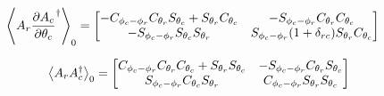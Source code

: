 \begin{align}\label{eqn:multiPendulumSpherical2:boo51}
\gpgradezero{ A_r \PD{\theta_c}{A_c}^\dagger }
&=
\begin{bmatrix}
-C_{\phi_c - \phi_r} C_{\theta_r} S_{\theta_c} + S_{\theta_r} C_{\theta_c} &
-S_{\phi_c - \phi_r} C_{\theta_r} C_{\theta_c} \\
-S_{\phi_c - \phi_r} S_{\theta_c} S_{\theta_r} &
S_{\phi_c - \phi_r} (1 + \delta_{rc}) S_{\theta_r} C_{\theta_c} 
\end{bmatrix}
\end{align}

\begin{align}\label{eqn:multiPendulumSpherical2:boo20x}
\gpgradezero{A_r A_c^\dagger}
=
\begin{bmatrix}
C_{\phi_c - \phi_r} 
C_{\theta_r}
C_{\theta_c}
+S_{\theta_r}
S_{\theta_c} &
-S_{\phi_c - \phi_r} C_{\theta_r} S_{\theta_c} \\
S_{\phi_c - \phi_r} C_{\theta_c} S_{\theta_r} &
C_{\phi_c - \phi_r} S_{\theta_r} S_{\theta_c}
\end{bmatrix}
\end{align}

\EndNoBibArticle
